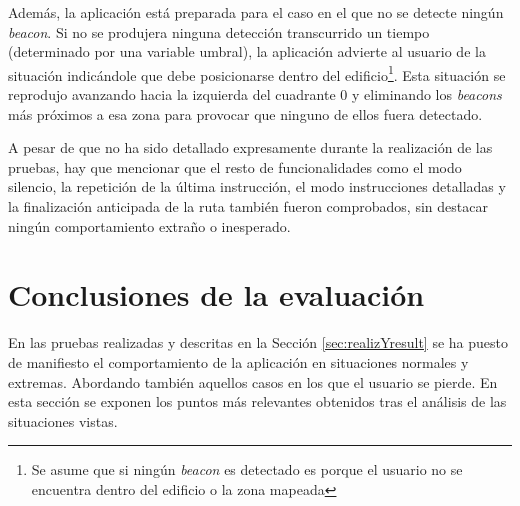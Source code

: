 Además, la aplicación está preparada para el caso en el que no se detecte ningún \textit{beacon}. Si no se produjera ninguna detección transcurrido un tiempo (determinado por una variable umbral), la aplicación advierte al usuario de la situación indicándole que debe posicionarse dentro del edificio\footnote{Se asume que si ningún \textit{beacon} es detectado es porque el usuario no se encuentra dentro del edificio o la zona mapeada}. Esta situación se reprodujo avanzando hacia la izquierda del cuadrante $0$ y eliminando los \textit{beacons} más próximos a esa zona para provocar que ninguno de ellos fuera detectado.

A pesar de que no ha sido detallado expresamente durante la realización de las pruebas, hay que mencionar que el resto de funcionalidades como el modo silencio, la repetición de la última instrucción, el modo instrucciones detalladas y la finalización anticipada de la ruta también fueron comprobados, sin destacar ningún comportamiento extraño o inesperado.

\section{Conclusiones de la evaluación}
\label{sec:conclusionesEval}

En las pruebas realizadas y descritas en la Sección \ref{sec:realizYresult} se ha puesto de manifiesto el comportamiento de la aplicación en situaciones normales y extremas. Abordando también aquellos casos en los que el usuario se pierde. En esta sección se exponen los puntos más relevantes obtenidos tras el análisis de las situaciones vistas.


